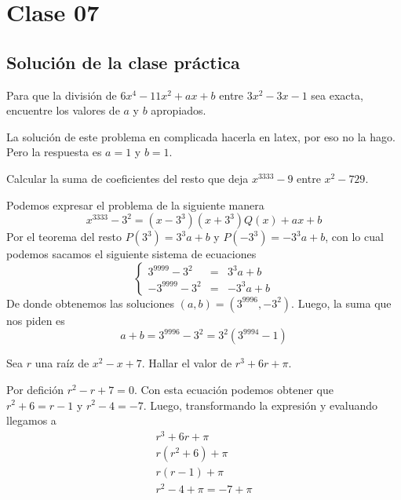 \section{Clase 07}

\subsection{Solución de la clase práctica}

\begin{section-problem}
    Para que la división de $6x^4 - 11x^2 + ax + b$ entre $3x^2 - 3x - 1$ sea exacta, encuentre los valores de $a$ y $b$ apropiados.

    \begin{solution}
        La solución de este problema en complicada hacerla en latex, por eso no la hago.
        Pero la respuesta es $a = 1$ y $b = 1$.
    \end{solution}
\end{section-problem}

\begin{section-problem}
    Calcular la suma de coeficientes del resto que deja $x^{3333} - 9$ entre $x^2 - 729$.

    \begin{solution}
        Podemos expresar el problema de la siguiente manera
        \[x^{3333} - 3^2 = (x - 3^3)(x + 3^3)Q(x) + ax + b\]
        Por el teorema del resto $P(3^3) = 3^3 a + b$ y $P(-3^3) = -3^3 a + b$, con lo cual podemos sacamos el siguiente sistema de ecuaciones
        \[
            \left\{
            \begin{array}{rcl}
            3^{9999} - 3^2 & =& 3^3 a + b\\
            -3^{9999} - 3^2 & =& -3^3 a + b
            \end{array}
            \right.
        \]
        De donde obtenemos las soluciones $(a, b) = (3^{9996}, -3^2)$.
        Luego, la suma que nos piden es
        \[a + b = 3^{9996} - 3^2 = \boxed{3^2(3^{9994} - 1)}\]
    \end{solution}
\end{section-problem}

\begin{section-problem}
    Sea $r$ una raíz de $x^2 - x + 7$.
    Hallar el valor de $r^3 + 6r + \pi$.

    \begin{solution}
        Por defición $r^2 - r + 7 = 0$.
        Con esta ecuación podemos obtener que $r^2 + 6 = r - 1$ y $r^2 - 4 = -7$.
        Luego, transformando la expresión y evaluando llegamos a
        \begin{gather*}
            r^3 + 6r + \pi\\
            r(r^2 + 6) + \pi\\
            r(r - 1) + \pi\\
            r^2 - 4 + \pi = \boxed{ -7 + \pi}
        \end{gather*}
    \end{solution}

\end{section-problem}

